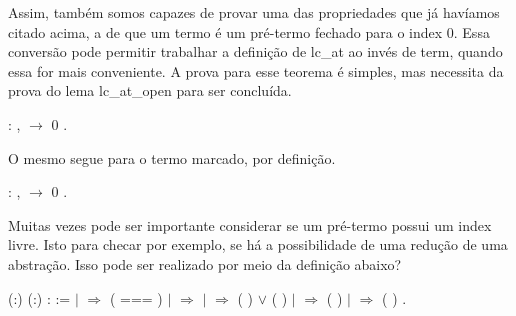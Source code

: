 Assim, também somos capazes de provar uma das propriedades que já havíamos citado acima, a de que um termo é um pré-termo
fechado para o index 0. Essa conversão pode permitir trabalhar a definição de lc\_at ao invés de term, quando essa for mais conveniente. A
prova para esse teorema é simples, mas necessita da prova do lema lc\_at\_open para ser concluída.\begin{coqdoccode}
\coqdocemptyline
\coqdocnoindent
{}  : \coqdockw{\ensuremath{\forall}} ,   \ensuremath{\rightarrow}  0 .\coqdoceol
\coqdocemptyline
\coqdocemptyline
\end{coqdoccode}
O mesmo segue para o termo marcado, por definição. \begin{coqdoccode}
\coqdocemptyline
\coqdocnoindent
{}  : \coqdockw{\ensuremath{\forall}} ,   \ensuremath{\rightarrow}  0 .\coqdoceol
\coqdocemptyline
\coqdocemptyline
\coqdocemptyline
\coqdocemptyline
\end{coqdoccode}
Muitas vezes pode ser importante considerar se um pré-termo possui um index livre. Isto para checar
por exemplo, se há a possibilidade de uma redução de uma abstração. Isso pode ser realizado por meio da definição abaixo?\begin{coqdoccode}
\coqdocemptyline
\coqdocnoindent
{}  (:) (:) :  :=\coqdoceol
\coqdocindent{1.00em}
  \coqdoceol
\coqdocindent{2.00em}
\ensuremath{|}   \ensuremath{\Rightarrow}  ( === )    \coqdoceol
\coqdocindent{2.00em}
\ensuremath{|}   \ensuremath{\Rightarrow} \coqdoceol
\coqdocindent{2.00em}
\ensuremath{|}    \ensuremath{\Rightarrow} (  ) \ensuremath{\lor} (  )\coqdoceol
\coqdocindent{2.00em}
\ensuremath{|}   \ensuremath{\Rightarrow}  ( ) \coqdoceol
\coqdocindent{2.00em}
\ensuremath{|}   \ensuremath{\Rightarrow}  ( ) \coqdoceol
\coqdocindent{1.00em}
.\coqdoceol
\coqdocemptyline
\coqdocemptyline
\end{coqdoccode}
